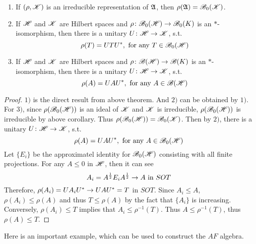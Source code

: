 \documentclass[a4paper,11pt]{report}
\begin{document}
\begin{cor} \label{cor10}
	\begin{enumerate}[label=\arabic*)]
		\item If $(\rho, \mathscr{K})$ is an irreducible representation of $\mathfrak{A}$, then $\rho(\mathfrak{A}) = \mathscr{B}_0(\mathscr{K})$.
		\item If $\mathscr{H}$ and $\mathscr{K}$ are Hilbert spaces and $\rho \colon \mathscr{B}_{0}\mathscr{(H)} \rightarrow \mathscr{B}_0(K)$ is an $*$-isomorphism, then there is a unitary $U \colon \mathscr{H} \rightarrow \mathscr{K}$, s.t.
		\begin{equation*}
			\rho(T) = U T U^{*}, \text{ for any } T \in \mathscr{B}_{0}\mathscr{(H)}
		\end{equation*}
		\item If $\mathscr{H}$ and $\mathscr{K}$ are Hilbert spaces and $\rho \colon \mathscr{B(H)} \rightarrow \mathscr{B}(K)$ is an $*$-isomorphism, then there is a unitary $U \colon \mathscr{H} \rightarrow \mathscr{K}$, s.t.
		\begin{equation*}
			\rho(A) = U A U^{*}, \text{ for any } A \in \mathscr{B(H)}
		\end{equation*}
	\end{enumerate}
\end{cor}
\begin{proof}
	$1)$ is the direct result from above theorem. And $2)$ can be obtained by $1)$. \\
	For $3)$, since $\rho(\mathscr{B}_{0}\mathscr{(H)})$ is an ideal of $\mathscr{K}$ and $\mathscr{K}$ is irreducible, $\rho(\mathscr{B}_{0}\mathscr{(H)})$ is irreducible by above corollary. Thus $\rho(\mathscr{B}_{0}\mathscr{(H)}) = \mathscr{B}_0(\mathscr{K})$. Then by $2)$, there is a unitary $U \colon \mathscr{H} \rightarrow \mathscr{K}$, s.t.
	\begin{equation*}
		\rho(A) = U A U^{*}, \text{ for any } A \in \mathscr{B}_{0}\mathscr{(H)}
	\end{equation*}
	Let $\{E_i\}$ be the approximatel identity for $\mathscr{B}_{0}\mathscr{(H)}$ consisting with all finite projections. For any $A \leqslant 0$ in $\mathscr{H}$, then it can see
	\begin{equation*}
		A_i = A^{\frac{1}{2}} E_i A^{\frac{1}{2}} \rightarrow A \text{ in } SOT
	\end{equation*}
	Therefore, $\rho(A_i) = U A_i U^{*} \rightarrow U A U^{*} = T$ in $SOT$. Since $A_i \leqslant A$, $\rho(A_i) \leqslant \rho(A)$ and thus $T \leqslant \rho(A)$ by the fact that $\{A_i\}$ is increasing. Conversely, $\rho(A_i) \leqslant T$ implies that $A_i \leqslant \rho^{-1}(T)$. Thus $A \leqslant \rho^{-1}(T)$, thus $\rho(A) \leqslant T$.
\end{proof}

Here is an important example, which can be used to construct the $AF$ algebra.
\end{document}
